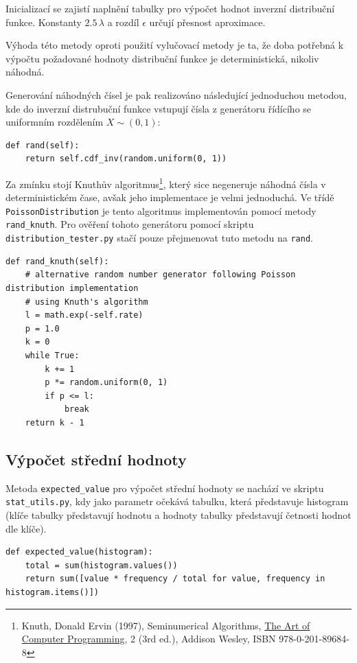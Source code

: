 \documentclass[12pt, a4paper]{article}
\begin{document}
    Inicializací se zajistí naplnění tabulky pro výpočet hodnot inverzní distribuční funkce. Konstanty $2.5\, \lambda$ a
    rozdíl $\epsilon$ určují přesnost aproximace.

    Výhoda této metody oproti použití vylučovací metody je ta, že doba potřebná k výpočtu požadované hodnoty distribuční funkce je
    deterministická, nikoliv náhodná.

    Generování náhodných čísel je pak realizováno následující jednoduchou metodou, kde do inverzní distrubuční funkce vstupují
    čísla z generátoru řídícího se uniformním rozdělením $X \sim (0, 1)$:

    \begin{lstlisting}
def rand(self):
    return self.cdf_inv(random.uniform(0, 1))
    \end{lstlisting}

    Za zmínku stojí Knuthův algoritmus\footnote{Knuth, Donald Ervin (1997), Seminumerical Algorithms, \hyperlink{https://en.wikipedia.org/wiki/The\_Art\_of\_Computer\_Programming}{The Art of Computer Programming}, 2 (3rd ed.), Addison Wesley, ISBN 978-0-201-89684-8}, který sice negeneruje náhodná čísla v deterministickém čase, avšak jeho implementace
    je velmi jednoduchá. Ve třídě \texttt{PoissonDistribution} je tento algoritmus implementován pomocí metody \texttt{rand\_knuth}.
    Pro ověření tohoto generátoru pomocí skriptu \texttt{distribution_tester.py} stačí pouze přejmenovat tuto metodu na \texttt{rand}.

    \pagebreak

    \begin{lstlisting}
def rand_knuth(self):
    # alternative random number generator following Poisson distribution implementation
    # using Knuth's algorithm
    l = math.exp(-self.rate)
    p = 1.0
    k = 0
    while True:
        k += 1
        p *= random.uniform(0, 1)
        if p <= l:
            break
    return k - 1
    \end{lstlisting}

    \subsection{Výpočet střední hodnoty}
    Metoda \texttt{expected\_value} pro výpočet střední hodnoty se nachází ve skriptu \texttt{stat\_utils.py}, kdy jako parametr očekává tabulku,
    která představuje histogram (klíče tabulky představují hodnotu a hodnoty tabulky představují četnosti hodnot dle klíče).

    \begin{lstlisting}
def expected_value(histogram):
    total = sum(histogram.values())
    return sum([value * frequency / total for value, frequency in histogram.items()])
    \end{lstlisting}
\end{document}
